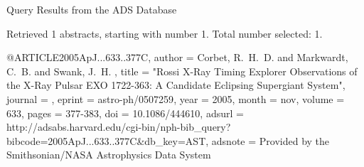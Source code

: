 Query Results from the ADS Database


Retrieved 1 abstracts, starting with number 1.  Total number selected: 1.

@ARTICLE{2005ApJ...633..377C,
   author = {{Corbet}, R.~H.~D. and {Markwardt}, C.~B. and {Swank}, J.~H.
	},
    title = "{Rossi X-Ray Timing Explorer Observations of the X-Ray Pulsar EXO 1722-363: A Candidate Eclipsing Supergiant System}",
  journal = {\apj},
   eprint = {astro-ph/0507259},
     year = 2005,
    month = nov,
   volume = 633,
    pages = {377-383},
      doi = {10.1086/444610},
   adsurl = {http://adsabs.harvard.edu/cgi-bin/nph-bib_query?bibcode=2005ApJ...633..377C&db_key=AST},
  adsnote = {Provided by the Smithsonian/NASA Astrophysics Data System}
}


